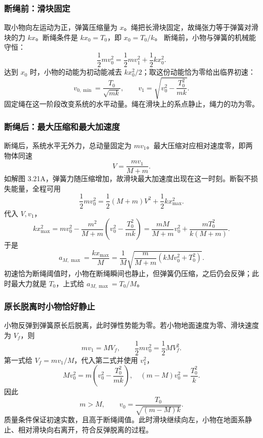 \documentclass[UTF8,fontset=fandol,a4paper,11pt]{ctexart}
\begin{document}
\subsubsection*{断绳前：滑块固定}
取小物向左运动为正，弹簧压缩量为 $x$。绳把长滑块固定，故绳张力等于弹簧对滑块的力 $kx$。断绳条件是 $kx_0=T_0$，即 $x_0=T_0/k$。
断绳前，小物与弹簧的机械能守恒：
\[
\frac12mv_0^2=\frac12mv_1^2+\frac12kx_0^2.
\]
达到 $x_0$ 时，小物的动能为初动能减去 $kx_0^2/2$；取这份动能恰为零给出临界初速：
\[
\boxed{v_{0,\min}=\frac{T_0}{\sqrt{mk}}},\qquad
v_1=\sqrt{v_0^2-\frac{T_0^2}{mk}}.
\]
固定绳在这一阶段改变系统的水平动量。绳在滑块上的系点静止，绳力的功为零。

\subsubsection*{断绳后：最大压缩和最大加速度}
断绳后，系统水平无外力，总动量固定为 $mv_1$。最大压缩对应相对速度零，即两物体同速
\[
V=\frac{mv_1}{M+m}.
\]
如解图 3.21A，弹簧力随压缩增加，故滑块最大加速度出现在这一时刻。断裂不损失能量，全程可用
\[
\frac12mv_0^2=\frac12(M+m)V^2+\frac12kx_{\max}^2.
\]
代入 $V,v_1$，
\[
kx_{\max}^2
=mv_0^2-\frac{m^2}{M+m}
\left(v_0^2-\frac{T_0^2}{mk}\right)
=\frac{mM}{M+m}v_0^2+\frac{mT_0^2}{k(M+m)}.
\]
于是
\[
\boxed{a_{M,\max}=\frac{kx_{\max}}M
=\frac1M\sqrt{\frac{m}{M+m}(kMv_0^2+T_0^2)}}.
\]
初速恰为断绳阈值时，小物在断绳瞬间也静止，但弹簧仍压缩，之后仍会反弹；此时最大力就是 $T_0$，上式给 $a_{M,\max}=T_0/M$。

\subsubsection*{原长脱离时小物恰好静止}
小物反弹到弹簧原长后脱离，此时弹性势能为零。若小物地面速度为零、滑块速度为 $V_f$，则
\[
mv_1=MV_f,\qquad
\frac12mv_0^2=\frac12MV_f^2.
\]
第一式给 $V_f=mv_1/M$，代入第二式并使用 $v_1^2$，
\[
Mv_0^2=m\left(v_0^2-\frac{T_0^2}{mk}\right),
\quad (m-M)v_0^2=\frac{T_0^2}{k}.
\]
因此
\[
\boxed{m>M,\qquad v_0=\frac{T_0}{\sqrt{(m-M)k}}}.
\]
质量条件保证初速实数，且高于断绳阈值。此时滑块继续向左，小物在地面系静止、相对滑块向右离开，符合反弹脱离的过程。
\end{document}
